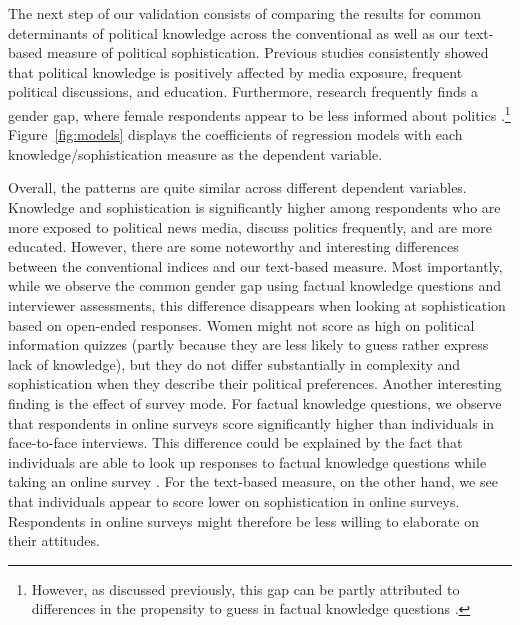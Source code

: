 \documentclass[12pt]{article}
\begin{document}
The next step of our validation consists of comparing the results for common determinants of political knowledge across the conventional as well as our text-based measure of political sophistication. Previous studies consistently showed that political knowledge is positively affected by media exposure, frequent political discussions, and education. Furthermore, research frequently finds a gender gap, where female respondents appear to be less informed about politics \citep[c.f.][]{barabas2014question}.\footnote{However, as discussed previously, this gap can be partly attributed to differences in the propensity to guess in factual knowledge questions \citep[e.g.][]{mondak2004knowledge}.} Figure~\ref{fig:models} displays the coefficients of regression models with each knowledge/sophistication measure as the dependent variable.

Overall, the patterns are quite similar across different dependent variables. Knowledge and sophistication is significantly higher among respondents who are more exposed to political news media, discuss politics frequently, and are more educated. However, there are some noteworthy and interesting differences between the conventional indices and our text-based measure. Most importantly, while we observe the common gender gap using factual knowledge questions and interviewer assessments, this difference disappears when looking at sophistication based on open-ended responses. Women might not score as high on political information quizzes (partly because they are less likely to guess rather express lack of knowledge), but they do not differ substantially in complexity and sophistication when they describe their political preferences. Another interesting finding is the effect of survey mode. For factual knowledge questions, we observe that respondents in online surveys score significantly higher than individuals in face-to-face interviews. This difference could be explained by the fact that individuals are able to look up responses to factual knowledge questions while taking an online survey \citep[see also][]{clifford2016cheating}. For the text-based measure, on the other hand, we see that individuals appear to score lower on sophistication in online surveys. Respondents in online surveys might therefore be less willing to elaborate on their attitudes.
\end{document}
